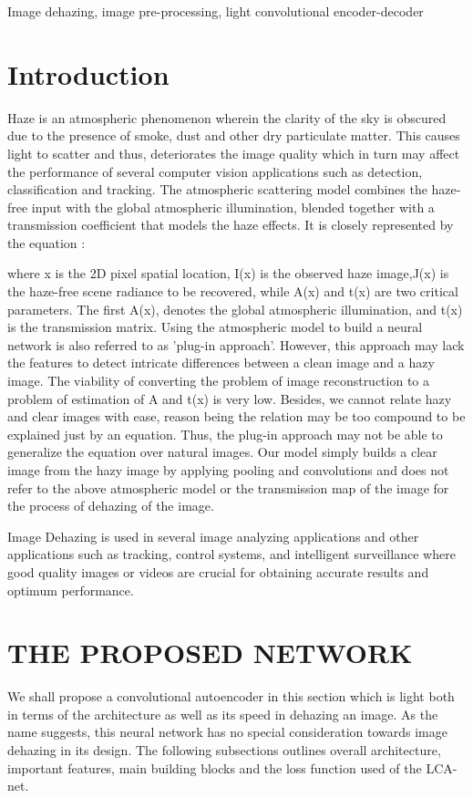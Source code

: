 \documentclass[conference]{IEEEtran}
\begin{document}
\begin{IEEEkeywords}

Image dehazing, image pre-processing, light convolutional encoder-decoder
\end{IEEEkeywords}

\section{Introduction}
Haze is an atmospheric phenomenon wherein the clarity of the sky is  obscured due to the presence of smoke, dust and other dry particulate matter. This causes light to scatter and thus, deteriorates the image quality which in turn may affect the performance of several computer vision applications such as detection, classification and tracking.
The atmospheric scattering model combines the haze-free
input with the global atmospheric illumination, blended together with a transmission coefficient that models the haze
effects. It is closely represented by the equation \cite{narasimhan2002vision}:


where x is the 2D pixel spatial location, I(x) is the observed
haze image,J(x) is the haze-free scene radiance to be recovered, while A(x) and t(x) are two critical parameters.
The first A(x), denotes the global atmospheric illumination, and t(x) is the transmission matrix.
\newline
Using the atmospheric model to build a neural network is also referred to as 'plug-in approach'. However, this approach may lack the features to detect intricate differences between a clean image and a hazy image. The viability of converting the problem of image reconstruction to a problem of estimation of A and t(x) is very low. Besides, we cannot relate hazy and clear images with ease, reason being the relation may be too compound to be explained just by an equation. Thus, the plug-in approach may not be able to generalize the equation over natural images.
Our model simply builds a clear image from the hazy image by applying pooling and convolutions and does not refer to the above atmospheric model or the transmission map of the image for the process of dehazing of the image.


Image Dehazing is used in several image analyzing applications and other applications such as tracking, control systems, and intelligent surveillance where good quality images or videos are crucial for obtaining accurate results and optimum performance.


\section{THE PROPOSED NETWORK}
We shall propose a convolutional autoencoder in this section which is light both in terms of the architecture as well as its speed in dehazing an image. As the name suggests, this neural network has no special consideration towards image dehazing in its design. The following subsections outlines overall architecture, important features, main building blocks and the loss function used of the LCA-net.
\end{document}
